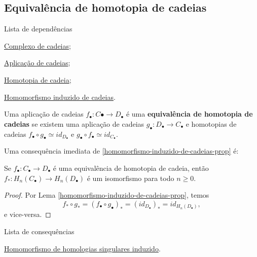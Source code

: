 \subsection{Equivalência de homotopia de cadeias} %
\label{equivalencia-de-homotopia-de-cadeias-def}
\begin{titlemize}{Lista de dependências}
	\item \hyperref[complexo-de-cadeias-def]{Complexo de cadeias};\\ 
    \item \hyperref[aplicacao-de-cadeias-def]{Aplicação de cadeias};\\
    \item \hyperref[homotopia-de-cadeias-def]{Homotopia de cadeia};\\
    \item \hyperref[homomorfismo-induzido-de-cadeias-prop]{Homomorfismo induzido de cadeias}.
\end{titlemize}

\begin{defi}
    Uma aplicação de cadeias $f_\bullet:C\bullet\rightarrow D_\bullet$ é uma \textbf{equivalência de homotopia de cadeias} se existem uma aplicação de cadeias $g_\bullet:D_\bullet\rightarrow C_\bullet$ e homotopias de cadeias $f_\bullet\circ g_\bullet\simeq id_{D_\bullet}$ e $g_\bullet\circ f_\bullet \simeq id_{C_\bullet}$.
\end{defi}

Uma consequência imediata de \ref{homomorfismo-induzido-de-cadeias-prop} é: 

\begin{lemma}
    Se $f_\bullet:C_\bullet\rightarrow D_\bullet$ é uma equivalência de homotopia de cadeia, então $f_*:H_n(C_\bullet)\rightarrow H_n(D_\bullet)$ é um isomorfismo para todo $n\ge 0$.
\end{lemma}

\begin{proof}
    Por Lema \ref{homomorfismo-induzido-de-cadeias-prop}, temos
    \[f_*\circ g_*=(f_\bullet\circ g_\bullet)_*=(id_{D_\bullet})_*=id_{H_n(D_\bullet)},\]
    e vice-versa. 
\end{proof}

\begin{titlemize}{Lista de consequências}
    \item \hyperref[homomorfismo-de-homologias-singulares-induzido-prop]{Homomorfismo de homologias singulares induzido}.\\
\end{titlemize}
